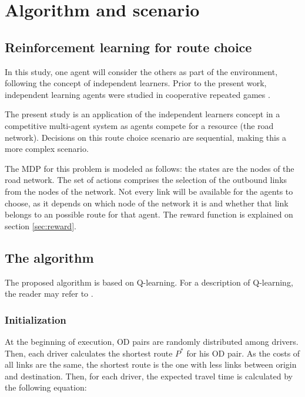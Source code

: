 \documentclass[12pt]{article}
\begin{document}
\section{Algorithm and scenario}
\label{sec:proposal}

\subsection{Reinforcement learning for route choice}

In this study, one agent will consider the others as part of the environment, following the concept of independent learners. Prior to the present work, independent learning agents were studied in cooperative repeated games \cite{Claus&Boutilier1998, Tan1993, Sen+1994}.

The present study is an application of the independent learners concept in a competitive multi-agent system as agents compete for a resource (the road network). Decisions on this route choice scenario are sequential, making this a more complex scenario. %

The MDP for this problem is modeled as follows: the states are the nodes of the road network. The set of actions comprises the selection of the outbound links from the nodes of the network. Not every link will be available for the agents to choose, as it depends on which node of the network it is and whether that link belongs to an possible route for that agent. The reward function is explained on section \ref{sec:reward}. %

\subsection{The algorithm}
The proposed algorithm is based on Q-learning. For a description of Q-learning, the reader may refer to \cite{Watkins&Dayan1992}. 

\subsubsection{Initialization}
At the beginning of execution, OD pairs are randomly distributed among drivers. Then, each driver calculates the shortest route $P^*$ for his OD pair. As the costs of all links are the same, the shortest route is the one with less links between origin and destination. Then, for each driver, the expected travel time is calculated by the following equation:
\end{document}
